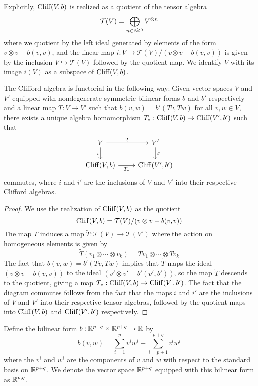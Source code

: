 %
Explicitly, $\operatorname{Cliff}(V,b)$ is realized as a quotient of the tensor algebra
\[
\mathcal{T}(V) = \bigoplus_{n \in \mathbb{Z}^{\geq 0}} V^{\otimes n}
\]
where we quotient by the left ideal generated by elements of the form
$v \otimes v - b(v,v)$, and the linear map
$i: V \to \mathcal{T}(V) / (v \otimes v - b(v,v))$
is given by the inclusion $V \hookrightarrow \mathcal{T}(V)$ followed by the
quotient map. We identify $V$ with its image $i(V)$ as a subspace of $\operatorname{Cliff}(V,b)$.
%
\begin{thm}
The Clifford algebra is functorial in the following way: Given vector spaces
$V$ and $V'$ equipped with nondegenerate symmetric bilinear forms $b$ and $b'$
respectively and a linear map $T: V \to V'$ such that $b(v,w) = b'(Tv,Tw)$
for all $v,w \in V$, there exists a unique algebra homomorphism
$T_* : \operatorname{Cliff}(V,b) \to \operatorname{Cliff}(V',b')$
such that
\[\begin{tikzcd}
V \ar[r, "T"] \ar[d, "i"']& V' \ar[d, "i'"]\\
\Cliff(V,b) \ar[r, "T_*"'] & \Cliff(V',b')
\end{tikzcd}\]
commutes, where $i$ and $i'$ are the inclusions of $V$ and $V'$ into their
respective Clifford algebras.
\end{thm}
%
\begin{proof}
We use the realization of $\operatorname{Cliff}(V,b)$ as the quotient
\[
\operatorname{Cliff}(V,b) = \mathcal{T}(V) / (v \otimes v - b(v,v))
\]
The map $T$ induces a map $\tilde{T} : \mathcal{T}(V) \to \mathcal{T}(V')$
where the action on homogeneous elements is given by
\[
\tilde{T}(v_1 \otimes \cdots \otimes v_k) = Tv_1 \otimes \cdots \otimes Tv_k
\]
The fact that $b(v,w) = b'(Tv, Tw)$ implies that $\tilde{T}$ maps the
ideal $(v \otimes v - b(v,v))$ to the ideal $(v' \otimes v' - b'(v',b'))$, so
the map $\tilde{T}$ descends to the quotient, giving a map
$T_* : \operatorname{Cliff}(V,b) \to \operatorname{Cliff}(V',b')$. The fact that the diagram commutes
follows from the fact that the maps $i$ and $i'$ are the inclusions of
$V$ and $V'$ into their respective tensor algebras, followed by the quotient
maps into $\operatorname{Cliff}(V,b)$ and $\operatorname{Cliff}(V', b')$ respectively.
\end{proof}
%
\begin{defn}
Define the bilinear form $b : \mathbb{R}^{p+q} \times \mathbb{R}^{p+q} \to \mathbb{R}$ by
\[
b(v,w) = \sum_{i = 1}^{p} v^iw^i - \sum_{i = p+1}^{p+q} v^iw^i
\]
where the $v^i$ and $w^i$ are the components of $v$ and $w$ with respect to
the standard basis on $\mathbb{R}^{p+q}$. We denote the vector space $\mathbb{R}^{p+q}$
equipped with this bilinear form as $\mathbb{R}^{p,q}$.
\end{defn}
